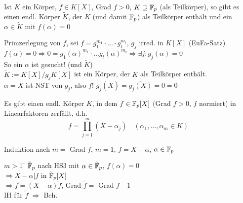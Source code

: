 \documentclass[a4paper,DIV15,BCOR12mm]{article}
\begin{document}
\begin{hilfssatz}[3]
Ist $K$ ein Körper, $f \in K[X]$, Grad $f > 0$, $K \supseteq \mathbb{F}_p$ (als Teilkörper), so gibt es einen endl. Körper $\tilde K$, der $K$ (und damit $\mathbb{F}_p$) als Teilkörper enthält und ein $\alpha \in \tilde K$ mit $f(\alpha)=0$
\end{hilfssatz}
\begin{beweis}
Primzerlegung von $f$, sei $f=g_1^{m_1} \cdot \dotsc \cdot g_t^{m_t}$, $g_j$ irred. in $K[X]$ (EuFa-Satz) \\
$f(\alpha) = 0 \Rightarrow 0 = g_1(\alpha)^{m_1} \cdot \dotsc g_t(\alpha)^{m_t} \Rightarrow \exists j: g_j(\alpha) = 0$ \\
So ein $\alpha$ ist gesucht! (und $\tilde K$)\\
$\tilde K := K[X]/g_jK[X]$ ist ein Körper, der $K$ als Teilkörper enthält. \\
$\alpha = \overline X$ ist NST von $g_j$, also $f$! $g_j(\overline X) = \overline{g_j(X)}=\overline 0 = 0$
\end{beweis}
\begin{hilfssatz}[4]
Es gibt einen endl. Körper $K$, in dem $f \in \mathbb{F}_p[X]$ (Grad $f > 0$, $f$ normiert) in Linearfaktoren zerfällt, d.h.
$$f=\prod_{j=1}^m(X-\alpha_j)\quad(\alpha_1,\dotsc,\alpha_m \in K)$$
\end{hilfssatz}
\begin{beweis}
Induktion nach $m =$ Grad $f$, $m=1$, $f=X-\alpha$, $\alpha \in \mathbb{F}_p$ 
\begin{tabbing}
$m>1$ \= $\tilde {\mathbb{F}}_p$ nach HS3 mit $\alpha \in \tilde {\mathbb{F}}_p$, $f(\alpha)=0$ \\
\> $\Rightarrow X-\alpha | f$ in $\tilde {\mathbb{F}}_p[X]$ \\
\> $\Rightarrow f = (X-\alpha)\tilde f$, Grad $\tilde f=$ Grad $f$ $-1$ \\
\> IH für $\tilde f$ $\Rightarrow$ Beh.
\end{tabbing}
\end{beweis}
\end{document}
